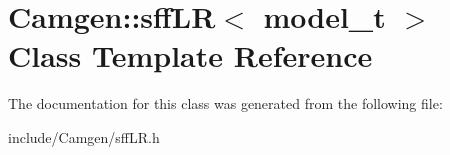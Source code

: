 \hypertarget{a00494}{\section{Camgen\-:\-:sff\-L\-R$<$ model\-\_\-t $>$ Class Template Reference}
\label{a00494}
}


The documentation for this class was generated from the following file\-:\begin{DoxyCompactItemize}
\item 
include/\-Camgen/sff\-L\-R.\-h\end{DoxyCompactItemize}
